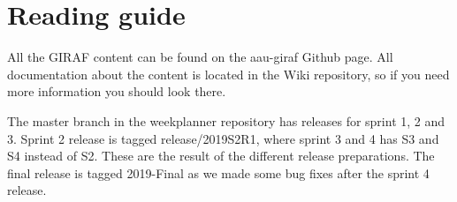 \section{Reading guide}

All the GIRAF content can be found on the aau-giraf Github page. All documentation about the content is located in the Wiki repository, so if you need more information you should look there.

The master branch in the weekplanner repository has releases for sprint 1, 2 and 3. Sprint 2 release is tagged release/2019S2R1, where sprint 3 and 4 has S3 and S4 instead of S2. These are the result of the different release preparations. The final release is tagged 2019-Final as we made some bug fixes after the sprint 4 release.